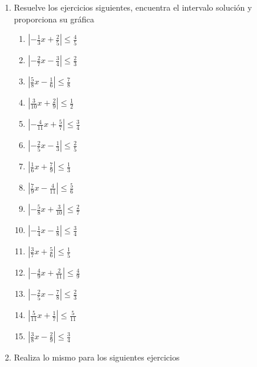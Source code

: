 \documentclass[12pt]{article}
\providecommand{\tightlist}{\setlength{\itemsep}{0pt}\setlength{\parskip}{0pt}}
\begin{document}
\begin{enumerate}
\def\labelenumi{\arabic{enumi}.}
\item
  Resuelve los ejercicios siguientes, encuentra el intervalo solución y
  proporciona su gráfica

  \begin{enumerate}
  \def\labelenumii{\roman{enumii}.}
  \tightlist
  \item
    \(|-\frac{1}{3}x+\frac{2}{5}| \leq \frac{4}{5}\)
  \item
    \(|-\frac{2}{7}x-\frac{3}{4}| \leq \frac{2}{3}\)
  \item
    \(|\frac{5}{8}x-\frac{1}{6}| \leq \frac{7}{8}\)
  \item
    \(|\frac{3}{10}x+\frac{2}{9}| \leq \frac{1}{2}\)
  \item
    \(|-\frac{4}{11}x+\frac{5}{7}| \leq \frac{3}{4}\)
  \item
    \(|-\frac{2}{5}x-\frac{1}{3}| \leq \frac{2}{5}\)
  \item
    \(|\frac{1}{6}x+\frac{7}{9}| \leq \frac{1}{3}\)
  \item
    \(|\frac{7}{9}x-\frac{4}{11}| \leq \frac{5}{6}\)
  \item
    \(|-\frac{5}{8}x+\frac{3}{10}| \leq \frac{2}{7}\)
  \item
    \(|-\frac{1}{4}x-\frac{1}{8}| \leq \frac{3}{4}\)
  \item
    \(|\frac{3}{7}x+\frac{5}{6}| \leq \frac{1}{5}\)
  \item
    \(|-\frac{4}{9}x+\frac{2}{11}| \leq \frac{4}{9}\)
  \item
    \(|-\frac{2}{5}x-\frac{7}{8}| \leq \frac{2}{3}\)
  \item
    \(|\frac{5}{11}x+\frac{1}{7}| \leq \frac{5}{11}\)
  \item
    \(|\frac{3}{8}x-\frac{2}{9}| \leq \frac{3}{4}\)
  \end{enumerate}
\item
  Realiza lo mismo para los siguientes ejercicios


\end{enumerate}
\end{document}
